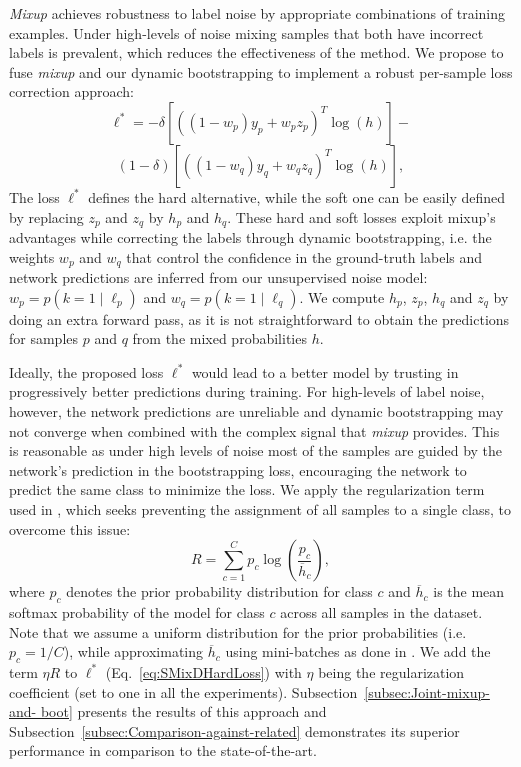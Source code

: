 \documentclass{article}
\begin{document}
\emph{Mixup} achieves robustness to label noise by 
appropriate combinations of training examples. Under high-levels of noise
 mixing samples that both have incorrect labels is prevalent, which reduces the effectiveness of the method. 
 We propose to fuse \emph{mixup} and our dynamic bootstrapping to implement a robust per-sample loss correction approach: 
\[
\ell^{*}=-\delta\left[\left(\left(1-w_{p}\right)y_{p}+w_{p}z_{p}\right)^T\log\left(\mathit{h}\right)\right]-
\]
\begin{equation}
\left(1-\delta\right)\left[\left(\left(1-w_{q}\right)y_{q}+w_{q}z_{q}\right)^T\log\left(\mathit{h}\right)\right],\label{eq:SMixDHardLoss}
\end{equation}
The loss $\ell^{*}$ defines the hard alternative, while the soft
one can be easily defined by replacing $z_{p}$ and $z_{q}$ by $h_{p}$
and $h_{q}$. These hard and soft losses exploit mixup's advantages
while correcting the labels through dynamic bootstrapping, i.e. the
weights $w_{p}$ and $w_{q}$ that control the confidence in the ground-truth
labels and network predictions are inferred from our unsupervised noise model:
$w_{p}=p\!\left(k=1\mid\ell_{p}\right)$ and $w_{q}=p\!\left(k=1\mid\ell_{q}\right)$.
We compute $h_{p}$, $z_{p}$, $h_{q}$ and $z_{q}$ by doing an extra forward pass, as it is not straightforward to obtain the predictions for samples $p$
and $q$ from the mixed probabilities $h$.

Ideally, the proposed loss $\ell^{*}$ would lead to a better model
by trusting in progressively better predictions during training. For high-levels of label noise, however, the network predictions are unreliable
and dynamic bootstrapping may not converge when combined with the
complex signal that \emph{mixup} provides. This is reasonable as under high
levels of noise most of the samples are guided by the network's prediction
in the bootstrapping loss, encouraging the network to predict the same
class to minimize the loss. We
apply the regularization term used in \cite{2018_CVPR_JointOpt},
which seeks preventing the assignment of all samples to a single class, to overcome this issue:
\begin{equation}
R=\sum_{c=1}^{C}p_{c}\log\left(\frac{p_{c}}{\overline{h}_{c}}\right),\label{eq:Regularization}
\end{equation}
where $p_{c}$ denotes the prior probability distribution for class
$c$ and $\overline{h}_{c}$ is the mean softmax probability of the
model for class $c$ across all samples in the dataset. Note that
we assume a uniform distribution for the prior probabilities (i.e.
$p_{c}=1/C$), while approximating $\overline{h}_{c}$ using mini-batches
as done in \cite{2018_CVPR_JointOpt}. We add the term $\eta R$ to $\ell^{*}$ (Eq.~\eqref{eq:SMixDHardLoss}) with $\eta$ being the regularization coefficient (set to one in all the experiments). Subsection~\ref{subsec:Joint-mixup-and- boot} presents the results of this
approach and Subsection~\ref{subsec:Comparison-against-related} demonstrates its superior performance in comparison to the state-of-the-art.
\end{document}
